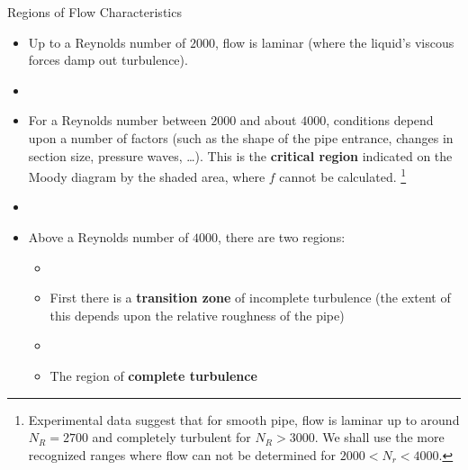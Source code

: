 \documentclass[9pt,xcolor=x11names,professionalfonts, mathserif]{beamer}
\begin{document}
											      										\begin{frame}{Regions of Flow Characteristics}
											      											\begin{mini}{
											      													\begin{itemize}
											      														\item Up to a Reynolds number of $2000$, flow is laminar \newline(where the liquid's viscous forces damp out turbulence).
											      														\item[]
											      														\item For a Reynolds number between $2000$ and about $4000$, conditions depend upon a number of factors (such as the
											      														      shape of the pipe entrance, changes in section size, pressure waves, \ldots). This is the \textbf{critical region} indicated
											      														      on the Moody diagram by the shaded area, where $f$ cannot be calculated.
											      														      \footnote{Experimental data suggest that for smooth pipe, flow is laminar up to around $N_R=2700$ and completely
											      														      	turbulent for $N_R > 3000$. We shall use the more recognized ranges where flow can not be determined for $2000 <
											      														      N_r < 4000$.}
											      														\item []
											      														\item Above a Reynolds number of $4000$, there are two regions:
											      														      
											      														      \begin{itemize}
											      														      	\item []
											      														      	\item First there is a \textbf{transition zone} of incomplete turbulence (the extent of this depends upon the relative roughness of
											      														      	      the pipe)
											      														      	\item []
											      														      	\item The region of \textbf{complete turbulence}
											      														      \end{itemize}
											      													\end{itemize}
											      													}\end{mini}
											      												\end{frame}
											      												
\end{document}

